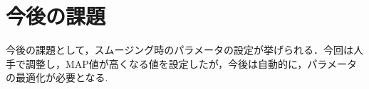 \section{今後の課題}
今後の課題として，スムージング時のパラメータの設定が挙げられる．今回は人手で調整し，MAP値が高くなる値を設定したが，今後は自動的に，パラメータの最適化が必要となる. 




